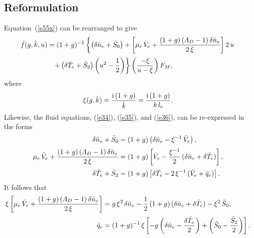 \documentclass[12pt,prb,aps]{revtex4-1}
\begin{document}
\subsection{Reformulation}
Equation~(\ref{e55x}) can be rearranged to give
\begin{align}\label{e37}
\bar{f}(g,\hat{k},u)&=(1+g)^{-1}\left\{\left(\delta\bar{n}_e+\bar{S}_0\right)+\left[\mu_e\,\bar{V}_e+\frac{(1+g)\,({\mit\Lambda}_D-1)\,\delta\bar{n}_e}{2\,\xi}\right]2\,u
\right.\nonumber\\[0.5ex]
&\phantom{=}\left.+\left(\delta\bar{T}_e+\bar{S}_2\right)\left(u^2-\frac{1}{2}\right)\right\}\left(\frac{-\xi}{u-\xi}\right)F_M,
\end{align}
where
\begin{equation}\label{exi}
\xi (g,\hat{k})= \frac{{\rm i}\,(1+g)}{\hat{k}}= \frac{{\rm i}\,(1+g)}{k\,l_e}.
\end{equation}
Likewise, the fluid equations, (\ref{e34}), (\ref{e35}), and (\ref{e36}), can be re-expressed in the forms
\begin{align}\label{e39}
\delta\bar{n}_e+\bar{S}_0&= (1+g)\left(\delta\bar{n}_e-\xi^{-1}\,\bar{V}_e\right),\\[0.5ex]
\mu_e\,\bar{V}_e+\frac{(1+g)\,({\mit\Lambda}_D-1)\,\delta\bar{n}_e}{2\,\xi}&= (1+g)\left[\bar{V}_e-\frac{\xi^{-1}}{2}\,(\delta\bar{n}_e+\delta\bar{T}_e)\right],\\[0.5ex]
\delta\bar{T}_e+\bar{S}_2&= (1+g)\left[\delta \bar{T}_e-2\,\xi^{-1}\,(\bar{V}_e+\bar{q}_e)\right].\label{e41}
\end{align}
It follows that
\begin{align}\label{e42}
\xi\left[\mu_e\,\bar{V}_e+\frac{(1+g)\,({\mit\Lambda}_D-1)\,\delta\bar{n}_e}{2\,\xi}\right]& = g\,\xi^2\,\delta\bar{n}_e-\frac{1}{2}\,(1+g)\,(\delta \bar{n}_e+\delta\bar{T}_e)
-\xi^2\,\hat{S}_0,\\[0.5ex]
\bar{q}_e&= (1+g)^{-1}\,\xi\left[-g\left(\delta\bar{n}_e-\frac{\delta\bar{T}_e}{2}\right)+\left(\bar{S}_0-\frac{\bar{S}_2}{2}\right)\right].\label{e43}
\end{align}
\end{document}
